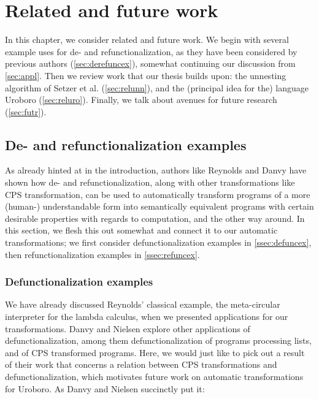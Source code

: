 \chapter{Related and future work}
\label{ch:rel}

In this chapter, we consider related and future work. We begin with several example uses for de- and refunctionalization, as they have been considered by previous authors (\autoref{sec:derefuncex}), somewhat continuing our discussion from \autoref{sec:appl}. Then we review work that our thesis builds upon: the unnesting algorithm of Setzer et al. (\autoref{sec:relunn}), and the (principal idea for the) language Uroboro (\autoref{sec:reluro}). Finally, we talk about avenues for future research (\autoref{sec:futr}).

\section{De- and refunctionalization examples}
\label{sec:derefuncex}

As already hinted at in the introduction, authors like Reynolds and Danvy have shown how de- and refunctionalization, along with other transformations like CPS transformation, can be used to automatically transform programs of a more (human-) understandable form into semantically equivalent programs with certain desirable properties with regards to computation, and the other way around. In this section, we flesh this out somewhat and connect it to our automatic transformations; we first consider defunctionalization examples in \autoref{ssec:defuncex}, then refunctionalization examples in \autoref{ssec:refuncex}.

\subsection{Defunctionalization examples}
\label{ssec:defuncex}

We have already discussed Reynolds' classical example, the meta-circular interpreter for the lambda calculus, when we presented applications for our transformations. Danvy and Nielsen\cite{danvy01defunctionalization} explore other applications of defunctionalization, among them defunctionalization of programs processing lists, and of CPS transformed programs. Here, we would just like to pick out a result of their work that concerns a relation between CPS transformations and defunctionalization, which motivates future work on automatic transformations for Uroboro. As Danvy and Nielsen succinctly put it:

